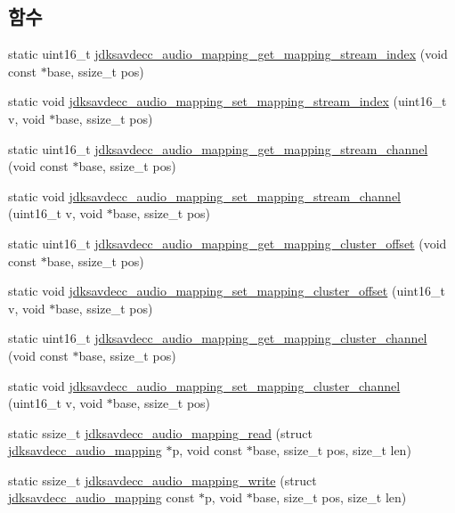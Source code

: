 \subsection*{함수}
\begin{DoxyCompactItemize}
\item 
static uint16\+\_\+t \hyperlink{group__audio__mapping_gad0cae65b8a99369e31936bb2814eba8d}{jdksavdecc\+\_\+audio\+\_\+mapping\+\_\+get\+\_\+mapping\+\_\+stream\+\_\+index} (void const $\ast$base, ssize\+\_\+t pos)
\item 
static void \hyperlink{group__audio__mapping_ga19d7ad962d8f4da0ebb861cf3dcac0e1}{jdksavdecc\+\_\+audio\+\_\+mapping\+\_\+set\+\_\+mapping\+\_\+stream\+\_\+index} (uint16\+\_\+t v, void $\ast$base, ssize\+\_\+t pos)
\item 
static uint16\+\_\+t \hyperlink{group__audio__mapping_gada8d158ad24f15281af51fc7210af055}{jdksavdecc\+\_\+audio\+\_\+mapping\+\_\+get\+\_\+mapping\+\_\+stream\+\_\+channel} (void const $\ast$base, ssize\+\_\+t pos)
\item 
static void \hyperlink{group__audio__mapping_gab6db9e6278806dc603040a6a64307f7b}{jdksavdecc\+\_\+audio\+\_\+mapping\+\_\+set\+\_\+mapping\+\_\+stream\+\_\+channel} (uint16\+\_\+t v, void $\ast$base, ssize\+\_\+t pos)
\item 
static uint16\+\_\+t \hyperlink{group__audio__mapping_gac2d9b5fab8b77bfaf402f489af76a243}{jdksavdecc\+\_\+audio\+\_\+mapping\+\_\+get\+\_\+mapping\+\_\+cluster\+\_\+offset} (void const $\ast$base, ssize\+\_\+t pos)
\item 
static void \hyperlink{group__audio__mapping_ga7f3899cb2a545c3b51c6eba8701632c8}{jdksavdecc\+\_\+audio\+\_\+mapping\+\_\+set\+\_\+mapping\+\_\+cluster\+\_\+offset} (uint16\+\_\+t v, void $\ast$base, ssize\+\_\+t pos)
\item 
static uint16\+\_\+t \hyperlink{group__audio__mapping_ga84394f6ee3d78cb732f62a698c25ca6d}{jdksavdecc\+\_\+audio\+\_\+mapping\+\_\+get\+\_\+mapping\+\_\+cluster\+\_\+channel} (void const $\ast$base, ssize\+\_\+t pos)
\item 
static void \hyperlink{group__audio__mapping_gaa9de5841a8f388d0ee56824fd906700d}{jdksavdecc\+\_\+audio\+\_\+mapping\+\_\+set\+\_\+mapping\+\_\+cluster\+\_\+channel} (uint16\+\_\+t v, void $\ast$base, ssize\+\_\+t pos)
\item 
static ssize\+\_\+t \hyperlink{group__audio__mapping_ga02ef1f9046bc3907adac826182928266}{jdksavdecc\+\_\+audio\+\_\+mapping\+\_\+read} (struct \hyperlink{structjdksavdecc__audio__mapping}{jdksavdecc\+\_\+audio\+\_\+mapping} $\ast$p, void const $\ast$base, ssize\+\_\+t pos, size\+\_\+t len)
\item 
static ssize\+\_\+t \hyperlink{group__audio__mapping_gafe2b090b89f499663e46eb68754eca42}{jdksavdecc\+\_\+audio\+\_\+mapping\+\_\+write} (struct \hyperlink{structjdksavdecc__audio__mapping}{jdksavdecc\+\_\+audio\+\_\+mapping} const $\ast$p, void $\ast$base, size\+\_\+t pos, size\+\_\+t len)
\end{DoxyCompactItemize}


